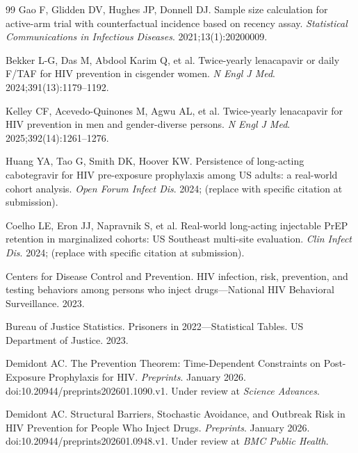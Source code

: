 \documentclass[11pt]{article}
\begin{document}
\begin{thebibliography}{99}
\small
{} Gao F, Glidden DV, Hughes JP, Donnell DJ. Sample size calculation for active-arm trial with counterfactual incidence based on recency assay. \emph{Statistical Communications in Infectious Diseases}. 2021;13(1):20200009.

 Bekker L-G, Das M, Abdool Karim Q, et al. Twice-yearly lenacapavir or daily F/TAF for HIV prevention in cisgender women. \emph{N Engl J Med}. 2024;391(13):1179--1192.

 Kelley CF, Acevedo-Quinones M, Agwu AL, et al. Twice-yearly lenacapavir for HIV prevention in men and gender-diverse persons. \emph{N Engl J Med}. 2025;392(14):1261--1276.

 Huang YA, Tao G, Smith DK, Hoover KW. Persistence of long-acting cabotegravir for HIV pre-exposure prophylaxis among US adults: a real-world cohort analysis. \emph{Open Forum Infect Dis}. 2024; (replace with specific citation at submission).

 Coelho LE, Eron JJ, Napravnik S, et al. Real-world long-acting injectable PrEP retention in marginalized cohorts: US Southeast multi-site evaluation. \emph{Clin Infect Dis}. 2024; (replace with specific citation at submission).

 Centers for Disease Control and Prevention. HIV infection, risk, prevention, and testing behaviors among persons who inject drugs---National HIV Behavioral Surveillance. 2023.

 Bureau of Justice Statistics. Prisoners in 2022---Statistical Tables. US Department of Justice. 2023.

 Demidont AC. The Prevention Theorem: Time-Dependent Constraints on Post-Exposure Prophylaxis for HIV. \emph{Preprints}. January 2026. doi:10.20944/preprints202601.1090.v1. Under review at \emph{Science Advances}.

 Demidont AC. Structural Barriers, Stochastic Avoidance, and Outbreak Risk in HIV Prevention for People Who Inject Drugs. \emph{Preprints}. January 2026. doi:10.20944/preprints202601.0948.v1. Under review at \emph{BMC Public Health}.
\end{thebibliography}
\end{document}
